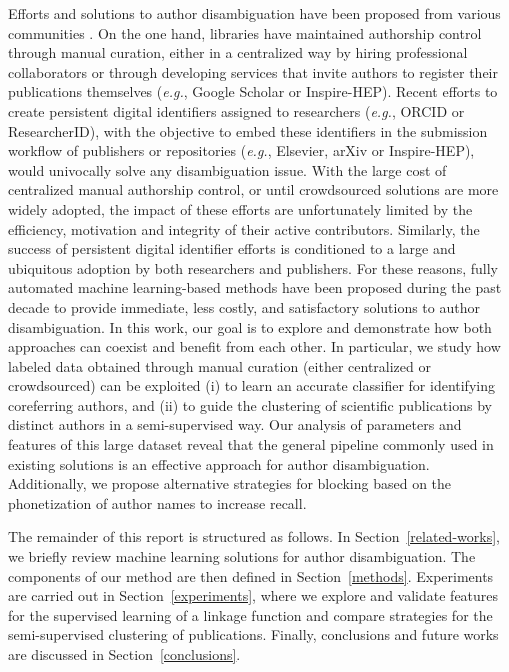 \documentclass[conference]{IEEEtran}
\newcommand{\eg}{\emph{e.g.}\xspace}
\begin{document}
Efforts and solutions to author disambiguation have been proposed from various
communities \cite{liu2014author}. On the one hand, libraries have maintained
authorship control through manual curation, either in a centralized way by
hiring professional collaborators or through developing services that invite authors to register
their publications themselves (\eg, Google Scholar or Inspire-HEP).
Recent efforts to create persistent digital identifiers assigned to researchers (\eg, ORCID or ResearcherID),
with the objective to embed these identifiers in the submission workflow of publishers
or repositories (\eg, Elsevier, arXiv or Inspire-HEP), would univocally solve any disambiguation issue.
With the large cost of centralized manual authorship control, or until crowdsourced solutions are more
widely adopted, the impact of these efforts are unfortunately limited by the efficiency, motivation
and integrity of their active contributors. Similarly, the success of persistent digital identifier efforts
is conditioned to a large and ubiquitous adoption by both researchers and publishers.
For these reasons, fully automated machine learning-based methods have been proposed during the past decade to
provide immediate, less costly, and satisfactory solutions to author
disambiguation. In this work, our goal is to explore and demonstrate how both
approaches can coexist and benefit from each other.
In particular, we study how labeled data obtained through manual curation (either centralized or
crowdsourced) can be exploited (i) to learn an accurate classifier for
identifying coreferring authors, and (ii) to guide the clustering of scientific
publications by distinct authors in a semi-supervised way.
Our analysis of parameters and features of this large dataset reveal that the general pipeline
commonly used in existing solutions is an effective approach for author disambiguation.
Additionally, we propose alternative strategies for blocking based on the
phonetization of author names to increase recall.

The remainder of this report is structured as follows. In Section~\ref{related-works},
we briefly review machine learning solutions for author disambiguation.
The components of our method are then defined in Section~\ref{methods}. Experiments
are carried out in Section~\ref{experiments}, where we explore and validate
features for the supervised learning of a linkage function and compare
strategies for the semi-supervised clustering of publications.
Finally, conclusions and future works are discussed in Section~\ref{conclusions}.
\end{document}
